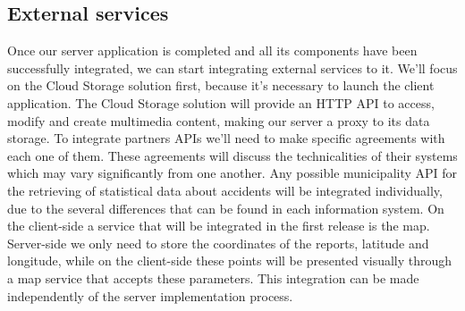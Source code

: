 \subsection{External services}
Once our server application is completed and all its components have been successfully integrated,
we can start integrating external services to it.
\newline
\newline
We'll focus on the Cloud Storage solution first, because it's necessary to launch the client application.
The Cloud Storage solution will provide an HTTP API to access, modify and create multimedia content,
making our server a proxy to its data storage.
\newline
\newline
To integrate partners APIs we'll need to make specific agreements with each one of them. These
agreements will discuss the technicalities of their systems which may vary significantly from
one another.
\newline
\newline
Any possible municipality API for the retrieving of
statistical data about accidents will be integrated individually, due to the several differences
that can be found in each information system.
\newline
\newline
On the client-side a service that will be integrated in the first release is the map. Server-side we only need
to store the coordinates of the reports, latitude and longitude, while on the client-side these points will be presented
visually through a map service that accepts these parameters. 
This integration can be made independently of the server implementation process.

